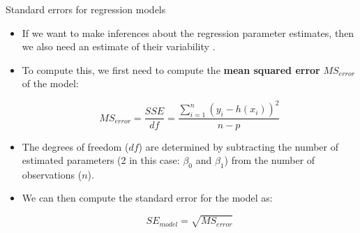 \documentclass[handout]{beamer}
\begin{document}
\begin{frame}{Standard errors for regression models}
\scriptsize{
\begin{itemize}
 \item If we want to make inferences about the regression parameter estimates, then we also need an estimate of their variability \cite{poldrack2019statistical}. 
 \item To compute this, we first need to compute the \textbf{mean squared error} $MS_{error}$ of the model:
 
 \begin{displaymath}
  MS_{error} = \frac{SSE}{df} = \frac{\sum_{i=1}^{n} (y_i-h(x_i))^2}{n-p}
 \end{displaymath}

 \item The degrees of freedom ($df$) are determined by subtracting the number of estimated parameters (2 in this case: $\beta_0$ and $\beta_1$) from the number of observations ($n$).

 \item  We can then compute the standard error for the model as:
 
 \begin{displaymath}
 SE_{model} = \sqrt{MS_{error}}
  \end{displaymath}

 
 


 
\end{itemize}


}
 
\end{frame}
\end{document}

